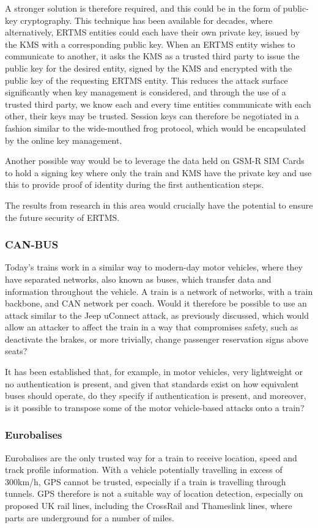 \documentclass[twoside,11pt,a4paper]{article}
\begin{document}
A stronger solution is therefore required, and this could be in the form of public-key cryptography. This technique has been available for decades, where alternatively, ERTMS entities could each have their own private key, issued by the KMS with a corresponding public key. When an ERTMS entity wishes to communicate to another, it asks the KMS as a trusted third party to issue the public key for the desired entity, signed by the KMS and encrypted with the public key of the requesting ERTMS entity. This reduces the attack surface significantly when key management is considered, and through the use of a trusted third party, we know each and every time entities communicate with each other, their keys may be trusted. Session keys can therefore be negotiated in a fashion similar to the wide-mouthed frog protocol, which would be encapsulated by the online key management.

Another possible way would be to leverage the data held on GSM-R SIM Cards to hold a signing key where only the train and KMS have the private key and use this to provide proof of identity during the first authentication steps.

The results from research in this area would crucially have the potential to ensure the future security of ERTMS.

\subsubsection{CAN-BUS}
Today's trains work in a similar way to modern-day motor vehicles, where they have separated networks, also known as buses, which transfer data and information throughout the vehicle. A train is a network of networks, with a train backbone, and CAN network per coach. Would it therefore be possible to use an attack similar to the Jeep uConnect attack, as previously discussed, which would allow an attacker to affect the train in a way that compromises safety, such as deactivate the brakes, or more trivially, change passenger reservation signs above seats?

It has been established that, for example, in motor vehicles, very lightweight or no authentication is present, and given that standards exist on how equivalent buses should operate, do they specify if authentication is present, and moreover, is it possible to transpose some of the motor vehicle-based attacks onto a train?

\subsubsection{Eurobalises}
Eurobalises are the only trusted way for a train to receive location, speed and track profile information. With a vehicle potentially travelling in excess of 300km/h, GPS cannot be trusted, especially if a train is travelling through tunnels. GPS therefore is not a suitable way of location detection, especially on proposed UK rail lines, including the CrossRail and Thameslink lines, where parts are underground for a number of miles. 
\end{document}
